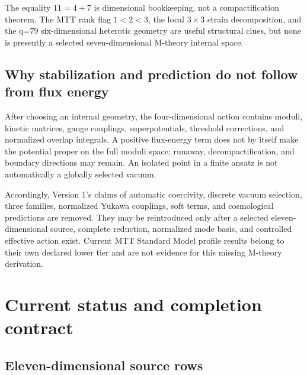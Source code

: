 \documentclass[11pt]{article}
\theoremstyle{definition}
\theoremstyle{remark}
\begin{document}
The equality \(11=4+7\) is dimensional bookkeeping, not a compactification
theorem.  The MTT rank flag \(1<2<3\), the local \(3\times3\) strain
decomposition, and the q=79 six-dimensional heterotic geometry are useful
structural clues, but none is presently a selected seven-dimensional
M-theory internal space.

\subsection{Why stabilization and prediction do not follow from flux energy}

After choosing an internal geometry, the four-dimensional action contains
moduli, kinetic matrices, gauge couplings, superpotentials, threshold
corrections, and normalized overlap integrals.  A positive flux-energy term
does not by itself make the potential proper on the full moduli space;
runaway, decompactification, and boundary directions may remain.  An isolated
point in a finite ansatz is not automatically a globally selected vacuum.

Accordingly, Version 1's claims of automatic coercivity, discrete vacuum
selection, three families, normalized Yukawa couplings, soft terms, and
cosmological predictions are removed.  They may be reintroduced only after a
selected eleven-dimensional source, complete reduction, normalized mode
basis, and controlled effective action exist.  Current MTT Standard Model
profile results belong to their own declared lower tier and are not evidence
for this missing M-theory derivation.

\section{Current status and completion contract}
\label{sec:frontier}

\subsection{Eleven-dimensional source rows}
\end{document}
